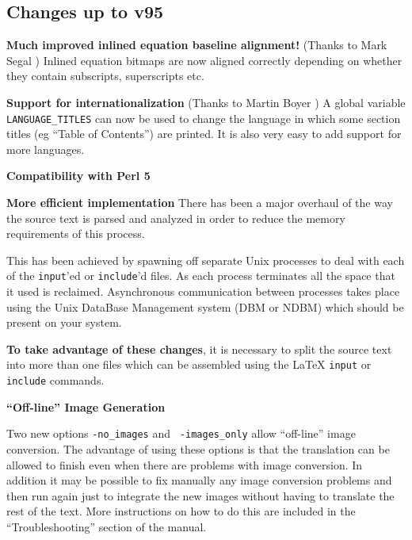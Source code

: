\subsection{Changes up to v95}
\begin{htmllist}
\item[\textbf{Much improved inlined equation baseline alignment!}]
(Thanks to Mark Segal )
Inlined equation bitmaps are now aligned correctly depending 
on whether they contain subscripts, superscripts etc. 
\item[\textbf{Support for internationalization}]
(Thanks to Martin Boyer )
A global variable \texttt{LANGUAGE\_TITLES} can now be used to change the
language in which some section titles (eg ``Table of Contents'') are
printed. It is also very easy to add support for more languages.
\item[\textbf{Compatibility with Perl 5}]
\item[\textbf{More efficient implementation}]
There has been a major overhaul of the way the source text is parsed
and analyzed in order to reduce the memory requirements of this
process.

This has been achieved by spawning off separate Unix processes to deal
with each of the \texttt{input}'ed or \texttt{include}'d files. As each
process
terminates all the space that it used is reclaimed. 
Asynchronous communication between processes takes place using 
the Unix DataBase Management system (DBM or NDBM) 
which should be present
on your system.

\textbf{To take advantage of these changes}, 
it is necessary to split the source text 
into more than one files which can be assembled using the \LaTeX
\texttt{input} or \texttt{include} commands.


\item[\textbf{``Off-line'' Image Generation}]

Two new options \texttt{-no\_images} and \texttt{ -images\_only} allow
``off-line'' image conversion. The advantage of using these options is 
that the translation can be allowed to finish even when there are
problems with image conversion. In addition it may be possible to 
fix manually any image conversion problems and then run \latextohtml{}
again just to integrate the new images without having to translate
the rest of the text. More instructions on how to do this are
included in the ``Troubleshooting'' section of the \latextohtml{}
manual.


\end{htmllist}
